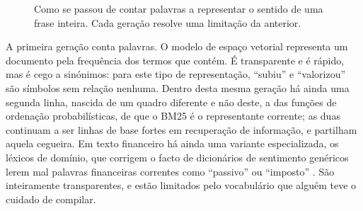 \begin{figure}[ht]
\centering
{}
\caption[Três gerações de representação de texto]{Como se passou de contar palavras a representar o
sentido de uma frase inteira. Cada geração resolve uma limitação da anterior.}
\label{fig:ctx_geracoes}
\end{figure}

A primeira geração conta palavras. O modelo de espaço vetorial \autocite{salton1975vsm} representa um
documento pela frequência dos termos que contém. É transparente e é rápido, mas é cego a sinónimos:
para este tipo de representação, ``subiu'' e ``valorizou'' são símbolos sem relação nenhuma. Dentro
desta mesma geração há ainda uma segunda linha, nascida de um quadro diferente e não deste, a das
funções de ordenação probabilísticas, de que o BM25 \autocite{robertson2009bm25} é o representante
corrente; as duas continuam a ser linhas de base fortes em recuperação de informação, e partilham
aquela cegueira. Em texto financeiro há ainda uma variante
especializada, os léxicos de domínio, que corrigem o facto de dicionários de sentimento genéricos
lerem mal palavras financeiras correntes como ``passivo'' ou ``imposto''
\autocite{loughran2011liability}. São inteiramente transparentes, e estão limitados pelo vocabulário
que alguém teve o cuidado de compilar.

